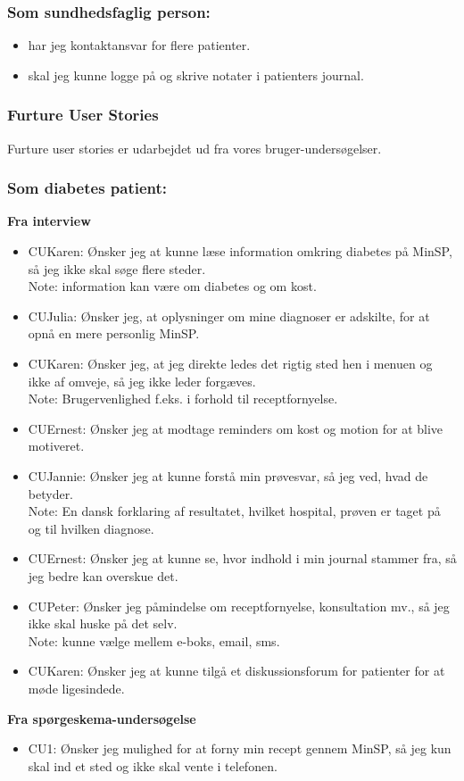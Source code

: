 \subsubsection*{Som sundhedsfaglig person:}
\begin{itemize}
\item har jeg kontaktansvar for flere patienter.
\item skal jeg kunne logge på og skrive notater i patienters journal.
\end{itemize}
\subsubsection{Furture User Stories}
Furture user stories er udarbejdet ud fra vores bruger-undersøgelser.
\subsubsection*{Som diabetes patient:}
\textbf{Fra interview}\\
\begin{itemize}
\item CUKaren: Ønsker jeg at kunne læse information omkring diabetes på MinSP, så jeg ikke skal søge flere steder. \\
Note: information kan være om diabetes og om kost.
\item CUJulia: Ønsker jeg, at oplysninger om mine diagnoser er adskilte, for at opnå en mere personlig MinSP. 
\item CUKaren: Ønsker jeg, at jeg direkte ledes det rigtig sted hen i menuen og ikke af omveje, så jeg ikke leder forgæves.\\ 
Note: Brugervenlighed f.eks. i forhold til receptfornyelse.
\item CUErnest: Ønsker jeg at modtage reminders om kost og motion for at blive motiveret.
\item CUJannie: Ønsker jeg at kunne forstå min prøvesvar, så jeg ved, hvad de betyder. \\
Note: En dansk forklaring af resultatet, hvilket hospital, prøven er taget på og til hvilken diagnose. 
\item CUErnest: Ønsker jeg at kunne se, hvor indhold i min journal stammer fra, så jeg bedre kan overskue det.
\item CUPeter: Ønsker jeg påmindelse om receptfornyelse, konsultation mv., så jeg ikke skal huske på det selv.\\ 
Note: kunne vælge mellem e-boks, email, sms.
\item CUKaren: Ønsker jeg at kunne tilgå et diskussionsforum for patienter for at møde ligesindede.
\end{itemize}
\textbf{Fra spørgeskema-undersøgelse}\\
\begin{itemize}
\item CU1: Ønsker jeg mulighed for at forny min recept gennem MinSP, så jeg kun skal ind et sted og ikke skal vente i telefonen.
\end{itemize}
%
